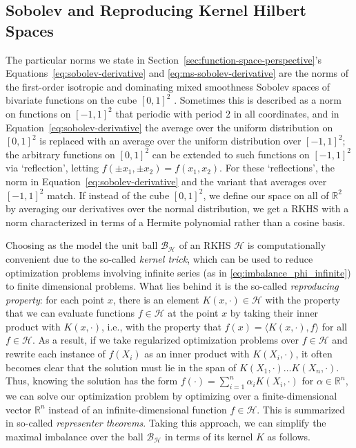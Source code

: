 \documentclass{article}
\theoremstyle{definition}
\newcommand{\R}{\ensuremath{\mathbb{R}}}
\newcommand{\calB}{\ensuremath{\mathcal{B}}}
\newcommand{\calH}{\ensuremath{\mathcal{H}}}
\newcommand{\<}{\langle}
\renewcommand{\>}{\rangle}
\begin{document}
\begin{refsection}
\subsection{Sobolev and Reproducing Kernel Hilbert Spaces}
\label{sec:sobolev-spaces}
The particular norms we state in Section~\ref{sec:function-space-perspective}'s Equations~\ref{eq:sobolev-derivative} and \ref{eq:ms-sobolev-derivative} are the norms of the first-order isotropic and dominating mixed smoothness Sobolev spaces of bivariate functions on the cube $[0, 1]^2$ \citep[e.g.,][Section 2.1]{kuhn2015approximation}. Sometimes this is described as a norm on functions on $[-1,1]^2$ that periodic with period $2$ in all coordinates, and in Equation~\ref{eq:sobolev-derivative} the average over the uniform distribution on
$[0,1]^2$ is replaced with an average over the uniform distribution over $[-1,1]^2$; the arbitrary functions on $[0,1]^2$ can be extended to such functions on $[-1,1]^2$ via `reflection', letting $f(\pm x_1, \pm x_2)=f(x_1, x_2)$. For these `reflections', the norm in Equation~\ref{eq:sobolev-derivative} and the variant that averages over $[-1,1]^2$ match. If instead of the cube $[0,1]^2$, we define our space on all of $\R^2$ by averaging our derivatives over the normal distribution, we get a RKHS with a norm characterized in terms of a Hermite polynomial rather than a cosine basis.


Choosing as the model the unit ball $\calB_\calH$ of an RKHS $\calH$ is computationally convenient due to the so-called \emph{kernel trick}, which can be used to reduce optimization problems involving infinite series (as in \ref{eq:imbalance_phi_infinite}) to finite dimensional problems. What lies behind it is the so-called \emph{reproducing property}: for each point $x$, there is an element $K(x,\cdot) \in \calH$ with the property that we can evaluate functions $f \in \calH$ at the point $x$ by taking their inner product with $K(x,\cdot)$, i.e., with the property that $f(x)=\langle K(x,\cdot), f\rangle$ for all $f \in \calH$. As a result, if we take regularized optimization problems over $f \in \calH$ and rewrite each instance of $f(X_i)$ as an inner product with $K(X_i,\cdot)$, it often becomes clear that the solution must lie in the span of $K(X_1,\cdot) \ldots K(X_n, \cdot)$. Thus, knowing the solution has the form $f(\cdot)=\sum_{i=1}^n \alpha_i K(X_i, \cdot)$ for $\alpha \in \R^n$, we can solve our optimization problem by optimizing over a finite-dimensional vector $\R^n$ instead of an infinite-dimensional function $f \in \calH$.
This is summarized in so-called \emph{representer theorems}. Taking this approach, we can simplify the maximal imbalance over the ball $\calB_\calH$ in terms of its kernel $K$ as follows.


\end{refsection}
\end{document}
